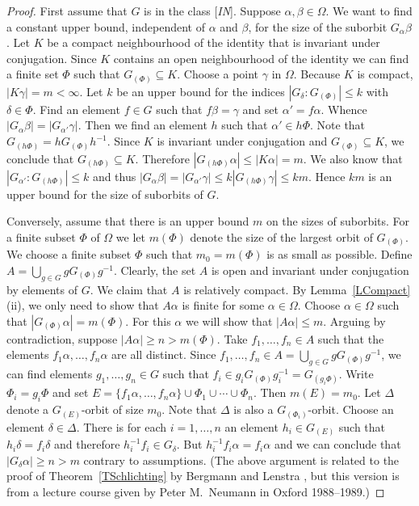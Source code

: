 \documentclass{emsprocart}
\theoremstyle{definition}
\begin{document}
\begin{proof}  First assume that $G$ is in the class [{\em IN}].
Suppose  $\alpha,\beta\in \Omega$.  We want to find a constant upper bound,
  independent of
 $\alpha$ and $\beta$, for the size of the suborbit $G_\alpha \beta$.
  Let $K$ be a compact neigh\-bourhood of the identity that is invariant
  under conjugation.  Since $K$ contains an open neigh\-bourhood of the
  identity we can find a finite set $\Phi$ such that $G_{(\Phi)}\subseteq
  K$.
Choose a point $\gamma$ in $\Omega$.
Because $K$ is compact,
  $|K\gamma|=m<\infty$.  Let $k$ be an upper bound for the indices
$|G_\delta:G_{(\Phi)}|\leq k$ with $\delta\in \Phi$.
  Find an element
  $f\in G$ such that $f\beta=\gamma$ and set $\alpha'=f\alpha$.  Whence
$|G_\alpha \beta|=|G_{\alpha'} \gamma|$.  Then we find an element $h$
  such that $\alpha'\in
  h\Phi$.  Note that $G_{(h\Phi)}=hG_{(\Phi)}h^{-1}$.  Since $K$ is invariant
  under conjugation and $G_{(\Phi)}\subseteq K$,
we conclude that  $G_{(h\Phi)}\subseteq K$.  There\-fore
  $|G_{(h\Phi)}\alpha|\leq
  |K\alpha|=m$.  We also know that $|G_{\alpha'}:G_{(h\Phi)}|\leq k$ and thus
$|G_{\alpha} \beta|=|G_{\alpha'} \gamma|\leq k|G_{(h\Phi)}\gamma|\leq km$.  Hence  $km$ 
is an upper bound for the size of suborbits of $G$.

Conversely, assume that there is an upper bound $m$ on the sizes of
suborbits.  For a finite subset $\Phi$ of $\Omega$ we let $m(\Phi)$ denote the
size of the largest orbit of $G_{(\Phi)}$.  We choose  a finite subset
$\Phi$ such that $m_0=m(\Phi)$ is as small as possible.  Define
$A=\bigcup_{g\in G} gG_{(\Phi)}g^{-1}$.  Clearly, the set $A$ is open
and invariant under conjugation by elements of $G$.
We claim that $A$ is relatively
compact.  By Lemma~\ref{LCompact}(ii), 
we only need to show that $A\alpha$ is finite for some
$\alpha\in \Omega$.  Choose $\alpha\in \Omega$ such that
$|G_{(\Phi)}\alpha|=m(\Phi)$.  For this $\alpha$ we will show that
$|A\alpha|\leq m$.  Arguing by contradiction, suppose
$|A\alpha|\geq n>m(\Phi)$.  Take $f_1, \ldots, f_n\in A$ such that the
elements $f_1\alpha, \ldots, f_n\alpha$ are all distinct.   Since $f_1, \ldots,
f_n\in A=\bigcup_{g\in G} gG_{(\Phi)}g^{-1}$, we can find elements $g_1,
\ldots, g_n\in G$ such that $f_i\in g_iG_{(\Phi)}g_i^{-1}=G_{(g_i\Phi)}$.
Write $\Phi_i=g_i\Phi$ and set
$E=\{f_1\alpha, \ldots, f_n\alpha\}\cup \Phi_1\cup\cdots\cup
\Phi_n$.  Then $m(E)=m_0$.  Let $\Delta$ denote a $G_{(E)}$-orbit of size $m_0$.  Note that $\Delta$ is also a $G_{(\Phi_i)}$-orbit.
Choose an element $\delta\in \Delta$.  There is for each
$i=1, \ldots, n$ an element $h_i\in G_{(E)}$ such that
$h_i\delta=f_i\delta$ and therefore
$h_i^{-1}f_i\in G_\delta$.  But
$h_i^{-1}f_i\alpha=f_i\alpha$ and we can conclude that $|G_\delta
\alpha|\geq n>m$
contrary to assumptions.  (The above argument is related to the proof
of Theorem~\ref{TSchlichting} by Bergmann and Lenstra
\cite{BergmanLenstra1989}, but this version is from a lecture course
given by Peter M.~Neumann  in Oxford 1988--1989.)  \end{proof}
\end{document}
